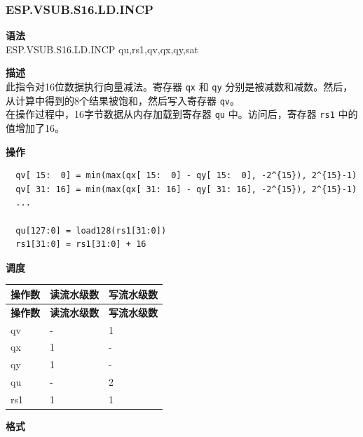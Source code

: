 \newpage

\newpage
\subsubsection{ESP.VSUB.S16.LD.INCP}\label{instruction:ESPVSUBS16LDINCP}
\textbf{语法}\\
ESP.VSUB.S16.LD.INCP qu,rs1,qv,qx,qy,sat

\textbf{描述}\\
此指令对16位数据执行向量减法。寄存器 \lstinline{qx} 和 \lstinline{qy} 分别是被减数和减数。然后，从计算中得到的8个结果被饱和，然后写入寄存器 \lstinline{qv}。\\ 在操作过程中，16字节数据从内存加载到寄存器 \lstinline{qu} 中。访问后，寄存器 \lstinline{rs1} 中的值增加了16。

\textbf{操作}\\
\begin{lstlisting}
  qv[ 15:  0] = min(max(qx[ 15:  0] - qy[ 15:  0], -2^{15}), 2^{15}-1)
  qv[ 31: 16] = min(max(qx[ 31: 16] - qy[ 31: 16], -2^{15}), 2^{15}-1)
  ...

  qu[127:0] = load128(rs1[31:0])
  rs1[31:0] = rs1[31:0] + 16
\end{lstlisting}


\textbf{调度}\\
\begin{longtable}[c]{|l|l|l|}
    \hline
    \rowcolor{lightgray}
    \textbf{操作数} & \textbf{读流水级数} & \textbf{写流水级数} \\\hline
    \endfirsthead
    \hline
    \rowcolor{lightgray}
     \textbf{操作数} & \textbf{读流水级数} & \textbf{写流水级数} \\\hline
    \endhead
    \hline
    \endfoot

  qv & - & 1 \\\hline
    qx & 1 & - \\\hline
    qy & 1 & - \\\hline
    qu & - & 2 \\\hline
    rs1 & 1 & 1

\end{longtable}

\textbf{格式}\\

